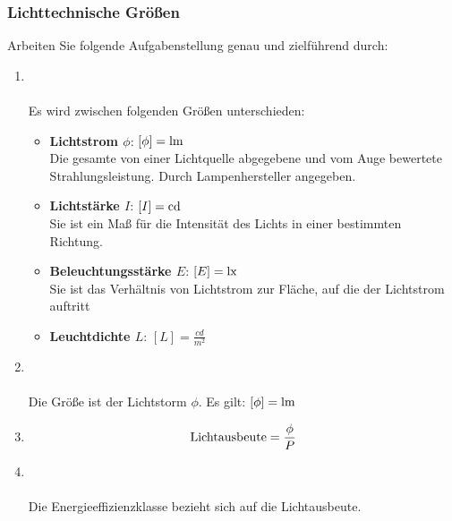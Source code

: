 \clearpage

\subsubsection{Lichttechnische Größen}
Arbeiten Sie folgende Aufgabenstellung genau und zielführend durch:

\begin{enumerate}
    \item   {} \\\\
            
            Es wird zwischen folgenden Größen unterschieden:
            \begin{itemize}
                \item \textbf{Lichtstrom $\phi$}: $\left[\phi\right] = \textnormal{lm}$ \\ Die gesamte von einer Lichtquelle abgegebene und vom Auge bewertete Strahlungsleistung. Durch Lampenhersteller angegeben.
                \item \textbf{Lichtstärke $I$}: $\left[I\right] = \textnormal{cd}$ \\ Sie ist ein Maß für die Intensität des Lichts in einer bestimmten Richtung.
                \item \textbf{Beleuchtungsstärke $E$}: $\left[E\right] = \textnormal{lx}$ \\ Sie ist das Verhältnis von Lichtstrom zur Fläche, auf die der Lichtstrom auftritt
                \item \textbf{Leuchtdichte $L$}: $\left[L\right] = \frac{cd}{m^2}$
            \end{itemize}

    \item   {} \\\\
            Die Größe ist der Lichtstorm $\phi$. Es gilt: $\left[\phi\right] = \textnormal{lm}$

    \item   {}
            $$\textnormal{Lichtausbeute} = \frac{\phi}{P}$$

    \item   {} \\\\
            Die Energieeffizienzklasse bezieht sich auf die Lichtausbeute.


\end{enumerate}
